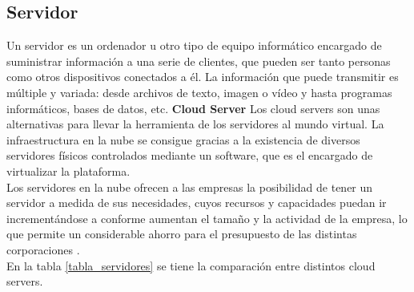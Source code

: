 \subsection{Servidor}
Un servidor es un ordenador u otro tipo de equipo informático encargado de suministrar información a una serie de clientes, que pueden ser tanto personas como otros dispositivos conectados a él. La información que puede transmitir es múltiple y variada: desde archivos de texto, imagen o vídeo y hasta programas informáticos, bases de datos, etc.
\textbf{Cloud Server}
Los cloud servers son unas alternativas para llevar la herramienta de los servidores al mundo virtual. La infraestructura en la nube se consigue gracias a la existencia de diversos servidores físicos controlados mediante un software, que es el encargado de virtualizar la plataforma.
\\Los servidores en la nube ofrecen a las empresas la posibilidad de tener un servidor a medida de sus necesidades, cuyos recursos y capacidades puedan ir incrementándose a conforme aumentan el tamaño y la actividad de la empresa, lo que permite un considerable ahorro para el presupuesto de las distintas corporaciones \citep{servidores}.
\\
En la tabla \ref{tabla_servidores} se tiene la comparación entre distintos cloud servers.
